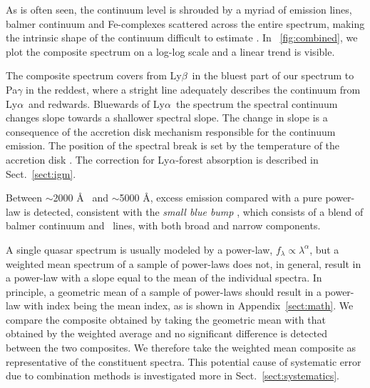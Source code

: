 \documentclass{aa}    %
\newcommand{\figref}[1]{\ref{fig:#1}}
\newcommand{\Fig}[1]{\figurename~\figref{#1}}
\newcommand{\fig}[1]{\Fig{#1}}
\newcommand{\figlabel}[1]{\label{fig:#1}}
\newcommand{\sectionname}{Sect.}
\newcommand{\Sect}[1]{\sectionname~\ref{sect:#1}}
\newcommand{\sect}[1]{\Sect{#1}}
\newcommand{\App}[1]{Appendix~\ref{sect:#1}}
\newcommand{\lya}{Ly$\alpha$}
\newcommand{\lyb}{Ly$\beta$}
\newcommand{\feii}{\ion{Fe}{ii}}
\begin{document}


As is often seen, the continuum level is shrouded by a myriad of emission lines, balmer continuum and Fe-complexes scattered across the entire spectrum, making the intrinsic shape of the continuum difficult to estimate \citep{Elvis2001}. In \fig{combined}, we plot the composite spectrum on a log-log scale and a linear trend is visible. 

The composite spectrum covers from \lyb ~in the bluest part of our spectrum to Pa$\gamma$ in the reddest, where a stright line adequately describes the continuum from \lya~and redwards. Bluewards of \lya~the spectrum the spectral continuum changes slope towards a shallower spectral slope. The change in slope is a consequence of the accretion disk mechanism responsible for the continuum emission. The position of the spectral break is set by the temperature of the accretion disk \citep{Pereyra2006}. The correction for \lya-forest absorption is described in \sect{igm}.


 Between $\sim$2000 \AA~ and $\sim$5000 \AA, excess emission compared with a pure power-law is detected, consistent with  the \textit{small blue bump} \citep{Wills1985}, which consists of a blend of balmer continuum and \feii ~lines, with both broad and narrow components.

 A single quasar spectrum is usually modeled by a power-law, $f_{\lambda} \propto \lambda^\alpha$, but a weighted mean spectrum of a sample of power-laws does not, in general, result in a power-law with a slope equal to the mean of the individual spectra. In principle, a geometric mean of a sample of power-laws should result in a power-law with index being the mean index, as is shown in \App{math}. We compare the composite obtained by taking the geometric mean with that obtained by the weighted average and no significant difference is detected between the two composites. We therefore take the  weighted mean composite as representative of the constituent spectra. This potential cause of systematic error due to combination methods is investigated more in \sect{systematics}.
\end{document}
